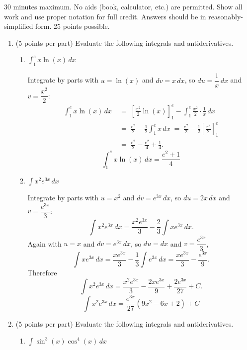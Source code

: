 \documentclass[12pt]{article}
\newcommand{\ds}{\displaystyle}
\begin{document}
30 minutes maximum.  No aids (book, calculator, etc.) are permitted.
Show all work and use proper notation for full credit.  Answers should
be in reasonably-simplified form.  25 points possible.

\begin{enumerate}
\item (5 points per part) Evaluate the following integrals and
  antiderivatives.
  \begin{enumerate}
  \item $\ds \int_1^e x \ln(x) \, dx$

\begin{solution}
Integrate by parts with $u=\ln(x)$ and $dv=x\,dx$, so $du=\dfrac{1}{x}\,dx$ and
$v=\dfrac{x^2}{2}$:
\begin{align*}
  \int_1^e x\ln(x)\,dx
  &\;=\; \left[\frac{x^2}{2}\ln(x)\right]_1^e-\int_1^e \frac{x^2}{2}\cdot\frac{1}{x}\,dx \\[4pt]
  &\;=\; \frac{e^2}{2}-\frac{1}{2}\int_1^e x\,dx
  \;=\; \frac{e^2}{2}-\frac{1}{2}\left[\frac{x^2}{2}\right]_1^e \\[4pt]
  &\;=\; \frac{e^2}{2}-\frac{e^2}{4}+\frac{1}{4}.
\end{align*}
\[
\boxed{\ \int_1^e x\ln(x)\,dx=\frac{e^2+1}{4}\ }
\]
\end{solution}

  \item $\ds \int x^2 e^{3x} \, dx$

\begin{solution}
Integrate by parts with $u=x^2$ and $dv=e^{3x}\,dx$, so $du=2x\,dx$ and
$v=\dfrac{e^{3x}}{3}$:
\[
\int x^2e^{3x}\,dx=\frac{x^2e^{3x}}{3}-\frac{2}{3}\int xe^{3x}\,dx .
\]
Again with $u=x$ and $dv=e^{3x}\,dx$, so $du=dx$ and $v=\dfrac{e^{3x}}{3}$,
\[
\int xe^{3x}\,dx=\frac{xe^{3x}}{3}-\frac{1}{3}\int e^{3x}\,dx=\frac{xe^{3x}}{3}-\frac{e^{3x}}{9}.
\]
Therefore
\[
\int x^2e^{3x}\,dx=\frac{x^2e^{3x}}{3}-\frac{2xe^{3x}}{9}+\frac{2e^{3x}}{27}+C .
\]
\[
\boxed{\ \int x^2e^{3x}\,dx=\frac{e^{3x}}{27}\left(9x^2-6x+2\right)+C\ }
\]
\end{solution}

  \end{enumerate}

  \newpage
  
\item (5 points per part) Evaluate the following integrals and
  antiderivatives.
  \begin{enumerate}
  \item $\ds \int \sin^3(x) \cos^4(x) \, dx$


\end{enumerate}
\end{enumerate}
\end{document}

